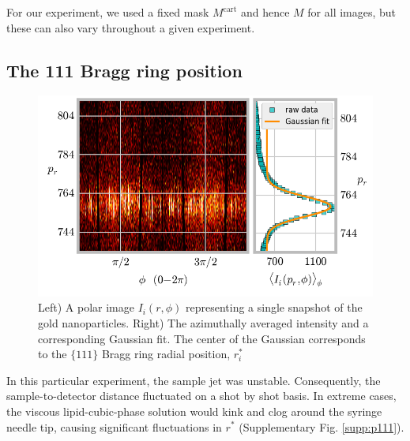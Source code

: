 \documentclass [12pt,fleqn]{article}
\begin{document}
For our experiment, we used a fixed mask $M^{\text{cart}}$ and hence $M$ for all images, but these can also vary throughout a given experiment.

%

\subsection{The 111 Bragg ring position}

\begin{figure}[H]
\includegraphics{supp_figs/bragg_ring_position.png}

\caption{Left) A polar image $I_i(r, \phi)$ representing a single snapshot of the gold nanoparticles. Right) The azimuthally averaged intensity and a corresponding Gaussian fit. The center of the Gaussian corresponds to the $\{111\}$ Bragg ring radial position, $r^*_i$}
\end{figure}
In this particular experiment, the sample jet was unstable. Consequently, the sample-to-detector distance fluctuated on a shot by shot basis. In extreme cases, the viscous lipid-cubic-phase solution would kink and clog around the syringe needle tip, causing significant fluctuations in $r^*$ (Supplementary Fig. \ref{supp:p111}).
\end{document}
